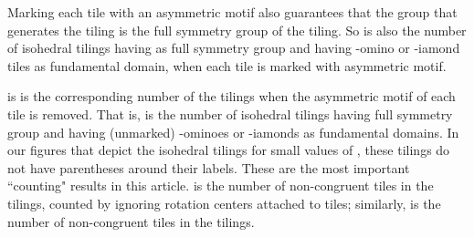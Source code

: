 \documentclass{ws-ijcga}
\begin{document}
Marking each tile with an asymmetric motif also guarantees that the group that generates the
tiling is the full symmetry group of the tiling. 
So  is also the number of isohedral tilings
having  as full symmetry group and having -omino or -iamond tiles as fundamental domain,
when each tile is marked with asymmetric motif.

 is is the corresponding number of the  tilings when the asymmetric motif of each tile is
removed. That is,  is the number of isohedral tilings having full symmetry group  and having
(unmarked) -ominoes or -iamonds as fundamental domains. 
In our figures that depict the
isohedral tilings for small values of , these tilings do not have parentheses around their labels. 
These are the most important ``counting" results in this article. 
 is the number of non-congruent
tiles in the  tilings, counted by ignoring rotation centers attached to tiles; similarly, 
 is the number of non-congruent tiles in the  tilings.
\begin{table}[h]
\label{tbl:p3}
\end{table}
\end{document}
